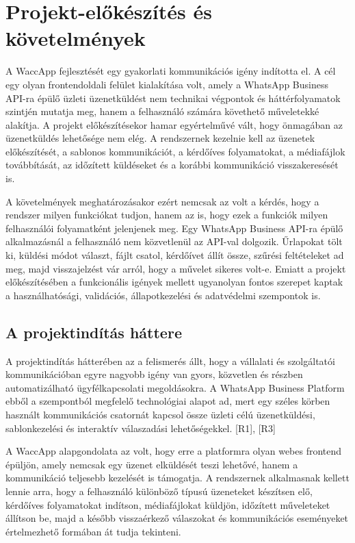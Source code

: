 \chapter{Projekt-előkészítés és követelmények}

A WaccApp fejlesztését egy gyakorlati kommunikációs igény indította el. A cél egy olyan frontendoldali felület kialakítása volt, amely a WhatsApp Business API-ra épülő üzleti üzenetküldést nem technikai végpontok és háttérfolyamatok szintjén mutatja meg, hanem a felhasználó számára követhető műveletekké alakítja. A projekt előkészítésekor hamar egyértelművé vált, hogy önmagában az üzenetküldés lehetősége nem elég. A rendszernek kezelnie kell az üzenetek előkészítését, a sablonos kommunikációt, a kérdőíves folyamatokat, a médiafájlok továbbítását, az időzített küldéseket és a korábbi kommunikáció visszakeresését is.

A követelmények meghatározásakor ezért nemcsak az volt a kérdés, hogy a rendszer milyen funkciókat tudjon, hanem az is, hogy ezek a funkciók milyen felhasználói folyamatként jelenjenek meg. Egy WhatsApp Business API-ra épülő alkalmazásnál a felhasználó nem közvetlenül az API-val dolgozik. Űrlapokat tölt ki, küldési módot választ, fájlt csatol, kérdőívet állít össze, szűrési feltételeket ad meg, majd visszajelzést vár arról, hogy a művelet sikeres volt-e. Emiatt a projekt előkészítésében a funkcionális igények mellett ugyanolyan fontos szerepet kaptak a használhatósági, validációs, állapotkezelési és adatvédelmi szempontok is.

\section{A projektindítás háttere}

A projektindítás hátterében az a felismerés állt, hogy a vállalati és szolgáltatói kommunikációban egyre nagyobb igény van gyors, közvetlen és részben automatizálható ügyfélkapcsolati megoldásokra. A WhatsApp Business Platform ebből a szempontból megfelelő technológiai alapot ad, mert egy széles körben használt kommunikációs csatornát kapcsol össze üzleti célú üzenetküldési, sablonkezelési és interaktív válaszadási lehetőségekkel. [R1], [R3]

A WaccApp alapgondolata az volt, hogy erre a platformra olyan webes frontend épüljön, amely nemcsak egy üzenet elküldését teszi lehetővé, hanem a kommunikáció teljesebb kezelését is támogatja. A rendszernek alkalmasnak kellett lennie arra, hogy a felhasználó különböző típusú üzeneteket készítsen elő, kérdőíves folyamatokat indítson, médiafájlokat küldjön, időzített műveleteket állítson be, majd a később visszaérkező válaszokat és kommunikációs eseményeket értelmezhető formában át tudja tekinteni.

